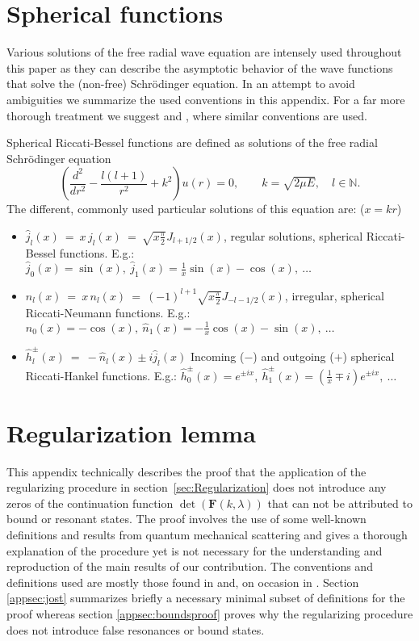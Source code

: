 \documentclass[mathpazo]{cicp}
\begin{document}
\appendix
\section{Spherical functions}
\label{app:spherical}
Various solutions of the free radial wave equation are intensely used throughout this paper as they can describe the asymptotic behavior of the wave functions that solve the (non-free) Schr\"odinger equation. In an attempt to avoid ambiguities we summarize the used conventions in this appendix. For a far more thorough treatment we suggest \cite{Abramowitz1972} and \cite{Taylor2006}, where similar conventions are used.

Spherical Riccati-Bessel functions are defined as solutions of the free radial Schr\"odinger equation
\begin{equation}
	\label{eq:radial_schrodinger_free}
  	\left(\frac{d^{2}}{dr^{2}} - \frac{l(l+1)}{r^{2}} + k^{2} \right) u(r) = 0, \qquad k=\sqrt{2\mu E},\quad l\in\mathbb{N}.
\end{equation}
The different, commonly used particular solutions of this equation are: ($x=kr$)
\begin{itemize}
	\item $\hat{j}_{l}(x) \ = \ x\,j_{l}(x) \ = \ \sqrt{x\frac{\pi}{2}}J_{l+1/2}(x)$, regular solutions, spherical Riccati-Bessel functions. E.g.: $\hat{j}_{0}(x) = \sin(x),\ \hat{j}_{1}(x) = \frac{1}{x}\sin(x)-\cos(x),\ \ldots$
	\item $\hat{n}_{l}(x) \ = \ x\,n_{l}(x) \ = \ (-1)^{l+1}\sqrt{x\frac{\pi}{2}}J_{-l-1/2}(x)$, irregular, spherical Riccati-Neumann functions. E.g.: $\hat{n}_{0}(x) = -\cos(x),\ \hat{n}_{1}(x) = -\frac{1}{x}\cos(x)-\sin(x),\ \ldots$
	\item $\hat{h}_{l}^{\pm}(x) \ = \ -\hat{n}_{l}(x) \pm i\hat{j}_{l}(x)$ Incoming ($-$) and outgoing ($+$) spherical Riccati-Hankel functions. E.g.: $\hat{h}_{0}^{\pm}(x) = e^{\pm ix},\ \hat{h}_{1}^{\pm}(x) = (\frac{1}{x} \mp i)e^{\pm ix},\ \ldots$
\end{itemize}

\section{Regularization lemma}
\label{app:regularization}
This appendix technically describes the proof that the application of the regularizing procedure in section~\ref{sec:Regularization} does not introduce any zeros of the continuation function $\det(\mathbold{F}(k,\lambda))$ that can not be attributed to bound or resonant states. The proof involves the use of some well-known definitions and results from quantum mechanical scattering and gives a thorough explanation of the procedure yet is not necessary for the understanding and reproduction of the main results of our contribution. The conventions and definitions used are mostly those found in \cite{Taylor2006} and, on occasion in \cite{Newton1982,Newton1960}. Section \ref{appsec:jost} summarizes briefly a necessary minimal subset of definitions for the proof whereas section \ref{appsec:boundsproof} proves why the regularizing procedure does not introduce false resonances or bound states.
\end{document}
